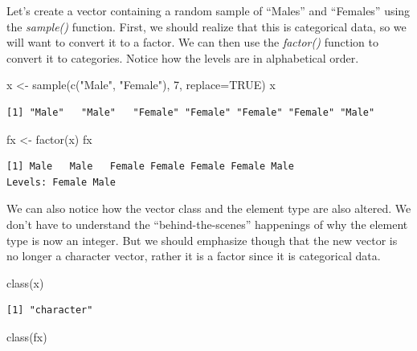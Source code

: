 \documentclass[
  letterpaper,
  DIV=11,
  numbers=noendperiod]{scrreprt}
\newenvironment{Shaded}{\begin{snugshade}}{\end{snugshade}}
\newcommand{\AttributeTok}[1]{\textcolor[rgb]{0.40,0.45,0.13}{#1}}
\newcommand{\ConstantTok}[1]{\textcolor[rgb]{0.56,0.35,0.01}{#1}}
\newcommand{\DecValTok}[1]{\textcolor[rgb]{0.68,0.00,0.00}{#1}}
\newcommand{\FunctionTok}[1]{\textcolor[rgb]{0.28,0.35,0.67}{#1}}
\newcommand{\NormalTok}[1]{\textcolor[rgb]{0.00,0.23,0.31}{#1}}
\newcommand{\OtherTok}[1]{\textcolor[rgb]{0.00,0.23,0.31}{#1}}
\newcommand{\StringTok}[1]{\textcolor[rgb]{0.13,0.47,0.30}{#1}}
\begin{document}
Let's create a vector containing a random sample of ``Males'' and
``Females'' using the \emph{sample()} function. First, we should realize
that this is categorical data, so we will want to convert it to a
factor. We can then use the \emph{factor()} function to convert it to
categories. Notice how the levels are in alphabetical order.

\begin{Shaded}
\begin{Highlighting}[]
\NormalTok{x }\OtherTok{\textless{}{-}} \FunctionTok{sample}\NormalTok{(}\FunctionTok{c}\NormalTok{(}\StringTok{"Male"}\NormalTok{, }\StringTok{"Female"}\NormalTok{), }\DecValTok{7}\NormalTok{, }\AttributeTok{replace=}\ConstantTok{TRUE}\NormalTok{)}
\NormalTok{x}
\end{Highlighting}
\end{Shaded}

\begin{verbatim}
[1] "Male"   "Male"   "Female" "Female" "Female" "Female" "Male"  
\end{verbatim}

\begin{Shaded}
\begin{Highlighting}[]
\NormalTok{fx }\OtherTok{\textless{}{-}} \FunctionTok{factor}\NormalTok{(x)}
\NormalTok{fx}
\end{Highlighting}
\end{Shaded}

\begin{verbatim}
[1] Male   Male   Female Female Female Female Male  
Levels: Female Male
\end{verbatim}

We can also notice how the vector class and the element type are also
altered. We don't have to understand the ``behind-the-scenes''
happenings of why the element type is now an integer. But we should
emphasize though that the new vector is no longer a character vector,
rather it is a factor since it is categorical data.

\begin{Shaded}
\begin{Highlighting}[]
\FunctionTok{class}\NormalTok{(x)}
\end{Highlighting}
\end{Shaded}

\begin{verbatim}
[1] "character"
\end{verbatim}

\begin{Shaded}
\begin{Highlighting}[]
\FunctionTok{class}\NormalTok{(fx)}
\end{Highlighting}
\end{Shaded}
\end{document}
